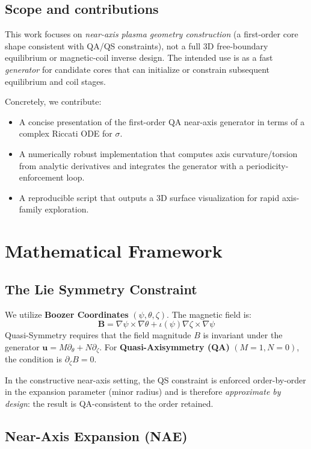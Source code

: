 \documentclass{article}
\begin{document}
\subsection{Scope and contributions}

This work focuses on \emph{near-axis plasma geometry construction} (a first-order core shape consistent with QA/QS constraints), not a full 3D free-boundary equilibrium or magnetic-coil inverse design.
The intended use is as a fast \emph{generator} for candidate cores that can initialize or constrain subsequent equilibrium and coil stages.

Concretely, we contribute:
\begin{itemize}
    \item A concise presentation of the first-order QA near-axis generator in terms of a complex Riccati ODE for $\sigma$.
    \item A numerically robust implementation that computes axis curvature/torsion from analytic derivatives and integrates the generator with a periodicity-enforcement loop.
    \item A reproducible script that outputs a 3D surface visualization for rapid axis-family exploration.
\end{itemize}

\section{Mathematical Framework}

\subsection{The Lie Symmetry Constraint}

We utilize \textbf{Boozer Coordinates} $(\psi, \theta, \zeta)$. The magnetic field is:
\[ \mathbf{B} = \nabla \psi \times \nabla \theta + \iota(\psi) \nabla \zeta \times \nabla \psi \]
Quasi-Symmetry requires that the field magnitude $B$ is invariant under the generator $\mathbf{u} = M \partial_\theta + N \partial_\zeta$.
For \textbf{Quasi-Axisymmetry (QA)} $(M=1, N=0)$, the condition is $\partial_\zeta B = 0$.

In the constructive near-axis setting, the QS constraint is enforced order-by-order in the expansion parameter (minor radius) and is therefore \emph{approximate by design}: the result is QA-consistent to the order retained.

\subsection{Near-Axis Expansion (NAE)}
\end{document}
